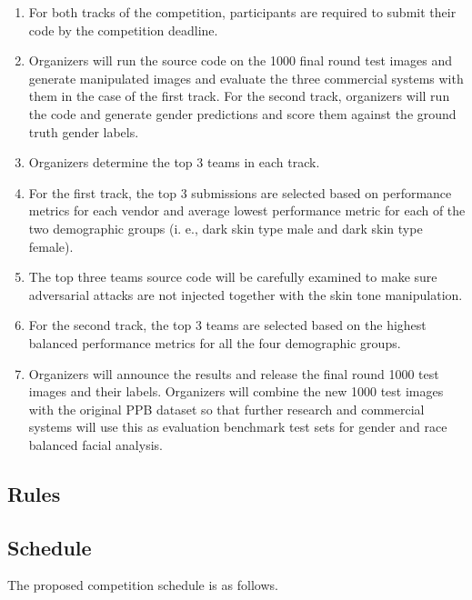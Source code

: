 \documentclass[11pt, oneside]{article}
\begin{document}
\begin{enumerate}
    \item For both tracks of the competition, participants are required to submit their code by the competition deadline.
    \item Organizers will run the source code on the 1000 final round test images and generate manipulated images and evaluate the three commercial systems with them in the case of the first track. For the second track, organizers will run the code and generate gender predictions and score them against the ground truth gender labels.
    \item Organizers determine the top 3 teams in each track. 
    \item For the first track, the top 3 submissions are selected based on performance metrics for each vendor and average lowest performance metric for each of the two demographic groups (i. e., dark skin type male and dark skin type female).
    \item The top three teams source code will be carefully examined to make sure adversarial attacks are not injected together with the skin tone manipulation.
    \item For the second track, the top 3 teams are selected based on the highest balanced performance metrics for all the four demographic groups.
    \item Organizers will announce the results and release the final round 1000 test images and their labels. Organizers will combine the new 1000 test images with the original PPB dataset so that further research and commercial systems will use this as evaluation benchmark test sets for gender and race balanced facial analysis.
\end{enumerate}


\subsection{Rules}


\subsection{Schedule}

The proposed competition schedule is as follows.
\end{document}
